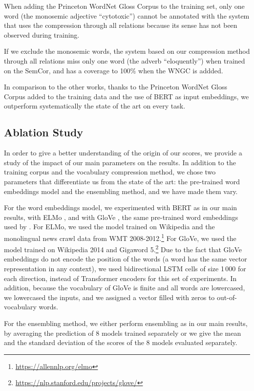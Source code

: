 \documentclass[11pt]{article}
\newcommand{\citep}[1]{\cite{#1}}
\newcommand{\citet}[1]{\newcite{#1}}
\begin{document}
When adding the Princeton WordNet Gloss Corpus to the training set, only one word (the monosemic adjective ``cytotoxic'') cannot be annotated with the system that uses the compression through all relations because its sense has not been observed during training.


If we exclude the monosemic words, the system based on our compression method through all relations miss only one word (the adverb ``eloquently'') when trained on the SemCor, and has a coverage to 100\% when the WNGC is addded.


In comparison to the other works, 
thanks to the Princeton WordNet Gloss Corpus added to the training data and the use of BERT as input embeddings, 
we outperform systematically the state of the art on every task.
\subsection{Ablation Study}

In order to give a better understanding of the origin of our scores, we provide a study of the impact of our main parameters on the results. In addition to the training corpus and the vocabulary compression method, we chose two parameters that differentiate us from the state of the art:
the pre-trained word embeddings model
and the ensembling method,
and we have made them vary. 

For the word embeddings model, we experimented with BERT \citep{devlin2018bert} as in our main results, with ELMo \citep{Peters2018}, and with GloVe \citep{pennington2014glove}, the same pre-trained word embeddings used by \citet{luo2018b}. 
For ELMo, we used the model trained on Wikipedia and the monolingual news crawl data from WMT 2008-2012.\footnote{\url{https://allennlp.org/elmo}} 
For GloVe, we used the model trained on Wikipedia 2014 and Gigaword 5.\footnote{\url{https://nlp.stanford.edu/projects/glove/}}
Due to the fact that GloVe embeddings do not encode the position of the words (a word has the same vector representation in any context), we used bidirectional LSTM cells of size 1\,000 for each direction, instead of Transformer encoders for this set of experiments. In addition, because the vocabulary of GloVe is finite and all words are lowercased, we lowercased the inputs, and we assigned a vector filled with zeros to out-of-vocabulary words.

For the ensembling method, we either perform ensembling as in our main results, by averaging the prediction of 8 models trained separately or 
we give the mean and the standard deviation of the scores of the 8 models evaluated separately.   
\end{document}
